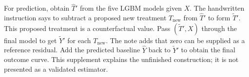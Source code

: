\documentclass[11pt,a4paper]{article}
\begin{document}
{For prediction, obtain $\hat T'$ from the five LGBM models given $X$. The handwritten instruction says to subtract a proposed new treatment $T_{\mathrm{new}}$ from $\hat T'$ to form $\widetilde T'$. This proposed treatment is a counterfactual value. Pass $(\widetilde T',X)$ through the final model to get $\widetilde Y'$ for each $T_{\mathrm{new}}$. The note adds that zero can be supplied as a reference residual. Add the predicted baseline $\hat Y$ back to $\widetilde Y'$ to obtain the final outcome curve. This supplement explains the unfinished construction; it is not presented as a validated estimator.

\begin{center}
\end{center}}
\end{document}
